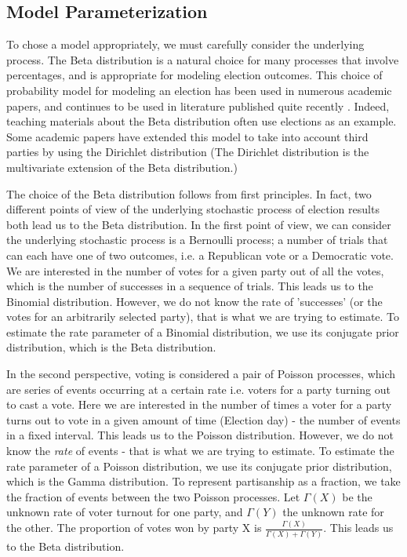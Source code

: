 \documentclass[preprint,12pt]{article}
\begin{document}
\subsection{Model Parameterization}
To chose a model appropriately, we must carefully consider the underlying process. 
The Beta distribution is a natural choice for many processes that involve percentages, and is appropriate for modeling election outcomes. 
This choice of probability model for modeling an election has been used in numerous academic papers, and continues to be used in literature published quite recently \cite{Paolino_2001_,Kaplan_2003_10.1287/opre.51.1.32.12794,Murr_2015_10.1177/2053168015583346}.
Indeed, teaching materials about the Beta distribution often use elections as an example.  
Some academic papers have extended this model to take into account third parties by using the Dirichlet distribution \cite{Rigdon_2009_10.1177/1532673X08330670} (The Dirichlet distribution is the multivariate extension of the Beta distribution.) 

The choice of the Beta distribution follows from first principles. 
In fact, two different points of view of the underlying stochastic process of election results both lead us to the Beta distribution. 
In the first point of view, we can consider the underlying stochastic process is a Bernoulli process; a number of trials that can each have one of two outcomes, i.e. a Republican vote or a Democratic vote.
We are interested in the number of votes for a given party out of all the votes, which is the number of successes in a sequence of trials.  
This leads us to the Binomial distribution. 
However, we do not know the rate of 'successes' (or the votes for an arbitrarily selected party), that is what we are trying to estimate.  
To estimate the rate parameter of a Binomial distribution, we use its conjugate prior distribution, which is the Beta distribution.

In the second perspective, voting is considered a pair of Poisson processes, which are series of events occurring at a certain rate i.e. voters for a party turning out to cast a vote. 
Here we are interested in the number of times a voter for a party turns out to vote in a given amount of time (Election day) - the number of events in a fixed interval. 
This leads us to the Poisson distribution.  
However, we do not know the \emph{rate} of events - that is what we are trying to estimate.  
To estimate the rate parameter of a Poisson distribution, we use its conjugate prior distribution, which is the Gamma distribution. 
To represent partisanship as a fraction, we take the fraction of events between the two Poisson processes.  
Let $\Gamma\left(X\right)$ be the unknown rate of voter turnout for one party, and $\Gamma\left(Y\right)$ the unknown rate for the other.
The proportion of votes won by party X is $\frac{\Gamma\left(X\right)}{\Gamma\left(X\right)+\Gamma\left(Y\right)} $. 
This leads us to the Beta distribution.
\end{document}
